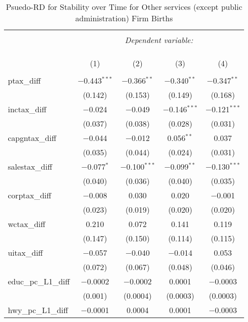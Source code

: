 
\begin{table}[!htbp] \centering 
  \caption{Psuedo-RD for Stability over Time for  Other services (except public administration) Firm Births} 
  \label{} 
\begin{tabular}{@{\extracolsep{5pt}}lcccc} 
\\[-1.8ex]\hline 
\hline \\[-1.8ex] 
 & \multicolumn{4}{c}{\textit{Dependent variable:}} \\ 
\cline{2-5} 
\\[-1.8ex] & \multicolumn{4}{c}{ } \\ 
\\[-1.8ex] & (1) & (2) & (3) & (4)\\ 
\hline \\[-1.8ex] 
 ptax\_diff & $-$0.443$^{***}$ & $-$0.366$^{**}$ & $-$0.340$^{**}$ & $-$0.347$^{**}$ \\ 
  & (0.142) & (0.153) & (0.149) & (0.168) \\ 
  inctax\_diff & $-$0.024 & $-$0.049 & $-$0.146$^{***}$ & $-$0.121$^{***}$ \\ 
  & (0.037) & (0.038) & (0.028) & (0.031) \\ 
  capgntax\_diff & $-$0.044 & $-$0.012 & 0.056$^{**}$ & 0.037 \\ 
  & (0.035) & (0.044) & (0.024) & (0.031) \\ 
  salestax\_diff & $-$0.077$^{*}$ & $-$0.100$^{***}$ & $-$0.099$^{**}$ & $-$0.130$^{***}$ \\ 
  & (0.040) & (0.036) & (0.040) & (0.035) \\ 
  corptax\_diff & $-$0.008 & 0.030 & 0.020 & $-$0.001 \\ 
  & (0.023) & (0.019) & (0.020) & (0.020) \\ 
  wctax\_diff & 0.210 & 0.072 & 0.141 & 0.119 \\ 
  & (0.147) & (0.150) & (0.114) & (0.115) \\ 
  uitax\_diff & $-$0.057 & $-$0.040 & $-$0.014 & 0.053 \\ 
  & (0.072) & (0.067) & (0.048) & (0.046) \\ 
  educ\_pc\_L1\_diff & $-$0.0002 & $-$0.0002 & 0.0001 & $-$0.0003 \\ 
  & (0.001) & (0.0004) & (0.0003) & (0.0003) \\ 
  hwy\_pc\_L1\_diff & $-$0.0001 & 0.0004 & 0.0001 & $-$0.0003 \\ 

\end{tabular}
\end{table}
